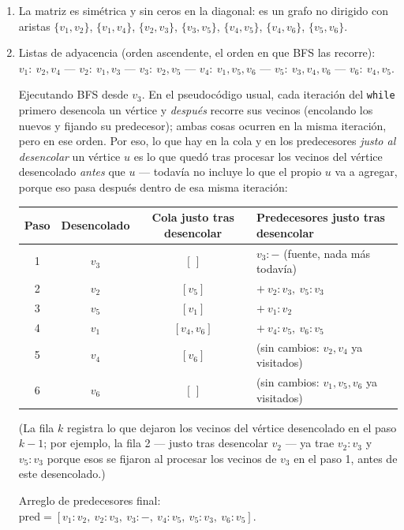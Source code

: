 \begin{enumerate}
  \item La matriz es simétrica y sin ceros en la diagonal: es un grafo no dirigido con aristas $\{v_1,v_2\}$, $\{v_1,v_4\}$, $\{v_2,v_3\}$, $\{v_3,v_5\}$, $\{v_4,v_5\}$, $\{v_4,v_6\}$, $\{v_5,v_6\}$.

  \item Listas de adyacencia (orden ascendente, el orden en que BFS las recorre): $v_1{:}\ v_2,v_4$ --- $v_2{:}\ v_1,v_3$ --- $v_3{:}\ v_2,v_5$ --- $v_4{:}\ v_1,v_5,v_6$ --- $v_5{:}\ v_3,v_4,v_6$ --- $v_6{:}\ v_4,v_5$.

  Ejecutando BFS desde $v_3$. En el pseudocódigo usual, cada iteración del \texttt{while} primero desencola un vértice y \emph{después} recorre sus vecinos (encolando los nuevos y fijando su predecesor); ambas cosas ocurren en la misma iteración, pero en ese orden. Por eso, lo que hay en la cola y en los predecesores \emph{justo al desencolar} un vértice $u$ es lo que quedó tras procesar los vecinos del vértice desencolado \emph{antes} que $u$ --- todavía no incluye lo que el propio $u$ va a agregar, porque eso pasa después dentro de esa misma iteración:

\begin{center}
\begin{tabular}{|c|c|c|l|}
\hline
\textbf{Paso} & \textbf{Desencolado} & \textbf{Cola justo tras desencolar} & \textbf{Predecesores justo tras desencolar} \\
\hline
1 & $v_3$ & $[\,]$ & $v_3{:}-$ (fuente, nada más todavía) \\
2 & $v_2$ & $[v_5]$ & $+\ v_2{:}v_3,\ v_5{:}v_3$ \\
3 & $v_5$ & $[v_1]$ & $+\ v_1{:}v_2$ \\
4 & $v_1$ & $[v_4, v_6]$ & $+\ v_4{:}v_5,\ v_6{:}v_5$ \\
5 & $v_4$ & $[v_6]$ & (sin cambios: $v_2,v_4$ ya visitados) \\
6 & $v_6$ & $[\,]$ & (sin cambios: $v_1,v_5,v_6$ ya visitados) \\
\hline
\end{tabular}
\end{center}

  (La fila $k$ registra lo que dejaron los vecinos del vértice desencolado en el paso $k-1$; por ejemplo, la fila 2 --- justo tras desencolar $v_2$ --- ya trae $v_2{:}v_3$ y $v_5{:}v_3$ porque esos se fijaron al procesar los vecinos de $v_3$ en el paso 1, antes de este desencolado.)

  Arreglo de predecesores final: $\text{pred} = [v_1{:}v_2,\ v_2{:}v_3,\ v_3{:}-,\ v_4{:}v_5,\ v_5{:}v_3,\ v_6{:}v_5]$.
\end{enumerate}
